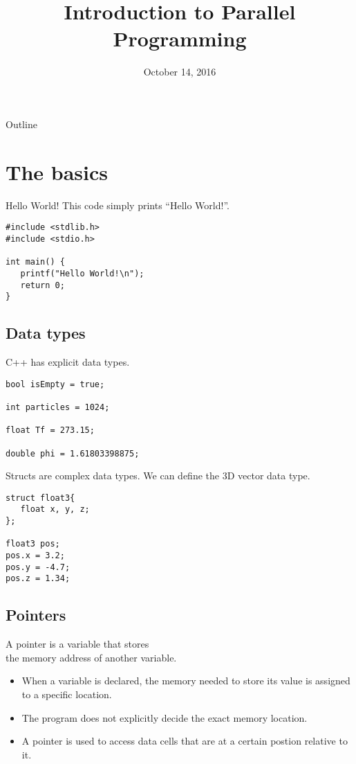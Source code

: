 \documentclass[xcolor={dvipsnames}]{beamer}
\title{Introduction to Parallel Programming}
\date{October 14, 2016}
\begin{document}
\begin{frame}
	\titlepage
\end{frame}

\begin{frame}{Outline}
	\tableofcontents
\end{frame}

	
\section{The basics}

\begin{frame}[fragile]{Hello World!}{}
This code simply prints ``Hello World!''.
\begin{lstlisting}
#include <stdlib.h>
#include <stdio.h>

int main() {
   printf("Hello World!\n");
   return 0;
}
\end{lstlisting}	
\end{frame}

\subsection{Data types}
\begin{frame}[fragile]{C++ has explicit data types.}{}
\begin{lstlisting}
bool isEmpty = true;

int particles = 1024;

float Tf = 273.15;

double phi = 1.61803398875;
\end{lstlisting}	
\end{frame}

\begin{frame}[fragile]{Structs are complex data types.}{}
We can define the 3D vector data type.
\begin{lstlisting}
struct float3{
   float x, y, z;
};

float3 pos;
pos.x = 3.2;
pos.y = -4.7;
pos.z = 1.34;
\end{lstlisting}	
\end{frame}

\subsection{Pointers}
\begin{frame}{A pointer is a variable that stores \\ the memory address of another variable.}{}
\begin{itemize}[<+->]
\item When a variable is declared, the memory needed to store its value is assigned to a specific location.
\bigskip
\item The program does not explicitly decide the exact memory location.
\bigskip
\item A pointer is used to access data cells that are at a certain postion relative to it.
\end{itemize}
\end{frame}
\end{document}
